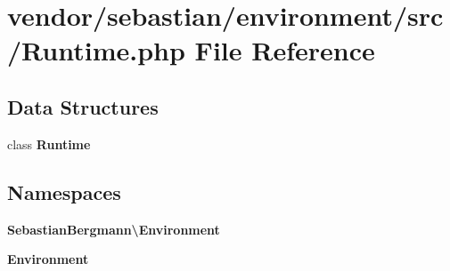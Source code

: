 \section{vendor/sebastian/environment/src/\+Runtime.php File Reference}
\label{_runtime_8php}
\subsection*{Data Structures}
\begin{DoxyCompactItemize}
\item 
class {\bf Runtime}
\end{DoxyCompactItemize}
\subsection*{Namespaces}
\begin{DoxyCompactItemize}
\item 
 {\bf Sebastian\+Bergmann\textbackslash{}\+Environment}
\item 
 {\bf Environment}
\end{DoxyCompactItemize}
